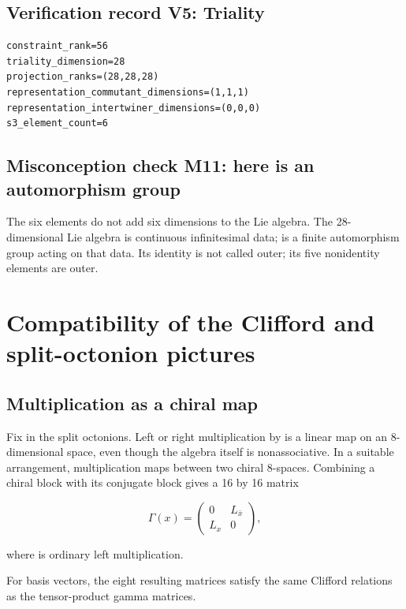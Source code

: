 \documentclass[11pt]{article}
\begin{document}
\subsection{Verification record V5: Triality}

\begin{Verbatim}[fontsize=\small]
constraint_rank=56
triality_dimension=28
projection_ranks=(28,28,28)
representation_commutant_dimensions=(1,1,1)
representation_intertwiner_dimensions=(0,0,0)
s3_element_count=6
\end{Verbatim}

\subsection{Misconception check M11: \texttt{} here is an automorphism group}

The six elements do not add six dimensions to the Lie algebra. The 28-dimensional Lie algebra is continuous infinitesimal data; \texttt{} is a finite automorphism group acting on that data. Its identity is not called outer; its five nonidentity elements are outer.

\section{Compatibility of the Clifford and split-octonion pictures}

\subsection{Multiplication as a chiral map}

Fix \texttt{} in the split octonions. Left or right multiplication by \texttt{} is a linear map on an 8-dimensional space, even though the algebra itself is nonassociative. In a suitable arrangement, multiplication maps between two chiral 8-spaces. Combining a chiral block with its conjugate block gives a 16 by 16 matrix

\[
\Gamma(x)=\begin{pmatrix}0&L_{\bar x}\\L_x&0\end{pmatrix},
\]

where \texttt{} is ordinary left multiplication.

For basis vectors, the eight resulting matrices satisfy the same Clifford relations as the tensor-product gamma matrices.
\end{document}
